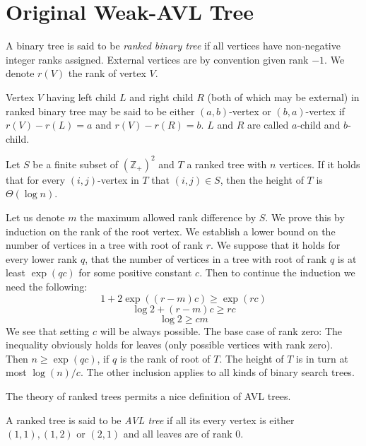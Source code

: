 

\section{Original Weak-AVL Tree}

\begin{defn}
A binary tree is said to be {\em ranked binary tree} if all vertices have non-negative integer ranks assigned. External vertices are by convention given rank $-1$. We denote $r(V)$ the rank of vertex $V$.
\end{defn}

\begin{defn}
Vertex $V$ having left child $L$ and right child $R$ (both of which may be external) in ranked binary tree may be said to be either $(a,b)$-vertex or $(b,a)$-vertex if $r(V) - r(L) = a$ and $r(V) - r(R) = b$. $L$ and $R$ are called $a$-child and $b$-child.
\end{defn}

\begin{prop}
Let $S$ be a finite subset of ${(\mathbb{Z} _ +)}^2$ and $T$ a ranked tree with $n$ vertices. If it holds that for every $(i,j)$-vertex in $T$ that $(i,j) \in S$, then the height of $T$ is $\Theta(\log n)$.
\label{thm-rbt-depth}
\end{prop}

\begin{myproof}
Let us denote $m$ the maximum allowed rank difference by $S$.
We prove this by induction on the rank of the root vertex. We establish a lower bound on the number of vertices in a tree with root of rank $r$. 
We suppose that it holds for every lower rank $q$, that the number of vertices in a tree with root of rank $q$ is at least $\exp(qc)$ for some positive constant $c$. 
Then to continue the induction we need the following: $$ 1 + 2\exp((r-m)c) \geq \exp(rc) $$ $$ \log 2 + (r-m)c \geq rc $$ $$ \log 2 \geq cm $$
We see that setting $c$ will be always possible.
The base case of rank zero: The inequality obviously holds for leaves (only possible vertices with rank zero).\\
Then $n \geq \exp(qc)$, if $q$ is the rank of root of $T$. The height of $T$ is in turn at most $ \log(n)/c $. 
The other inclusion applies to all kinds of binary search trees.
\end{myproof}

The theory of ranked trees permits a nice definition of AVL trees\cite{avl}.

\begin{defn}
A ranked tree is said to be {\em AVL tree} if all its every vertex is either $(1,1), (1,2)$ or $(2,1)$  and all leaves are of rank 0.
\end{defn}


